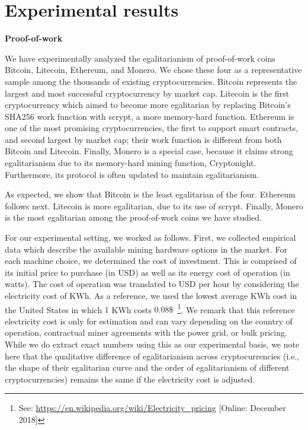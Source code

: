 \section{Experimental results}\label{sec:experiments}

\noindent\textbf{Proof-of-work}

\noindent
We have experimentally analyzed the egalitarianism of proof-of-work coins
Bitcoin, Litecoin, Ethereum, and Monero. We chose these four as a representative
sample among the thousands of existing cryptocurrencies. Bitcoin represents the
largest and most successful cryptocurrency by market cap. Litecoin is the first
cryptocurrency which aimed to become more egalitarian by replacing Bitcoin's
SHA256 work function with scrypt, a more memory-hard function. Ethereum is one
of the most promising cryptocurrencies, the first to support smart contracts,
and second largest by market cap; their work function is different from both
Bitcoin and Litecoin. Finally, Monero is a special case, because it claims
strong egalitarianism due to its memory-hard mining function, Cryptonight.
Furthermore, its protocol is often updated to maintain egalitarianism.

As expected, we show that Bitcoin is the least egalitarian of the four. Ethereum
follows next. Litecoin is more egalitarian, due to its use of scrypt. Finally,
Monero is the most egalitarian among the proof-of-work coins we have studied.


For our experimental setting, we worked as follows. First, we collected empirical
data which describe the available mining hardware options in the market. For
each machine choice, we determined the cost of investment. This is comprised
of its initial price to purchase (in USD) as well as its energy cost of
operation (in watts). The cost of operation was translated to USD per hour by
considering the electricity cost of KWh. As a reference, we used the lowest average KWh cost in
the United States in which $1$ KWh costs $0.08\$$~\footnote{See:
\url{https://en.wikipedia.org/wiki/Electricity_pricing} [Online: December 2018]}. We remark that this reference electricity cost is only for estimation and can vary depending on the country of
operation, contractual miner agreements with the power grid, or bulk pricing.
While we do extract exact numbers using this as our experimental basis, we note
here that the qualitative difference of egalitarianism across cryptocurrencies
(i.e., the shape of their egalitarian curve and the order of egalitarianism of
different cryptocurrencies) remains the same if the electricity cost is
adjusted.

